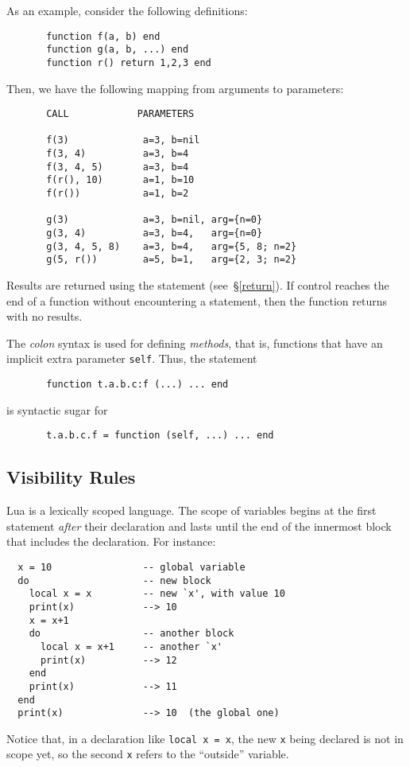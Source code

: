 \documentclass[11pt,twoside]{article}
\makeatletter
\newcommand{\See}[1]{\S\ref{#1}}
\newcommand{\see}[1]{(see~\See{#1})}
\newcommand{\T}[1]{{\tt #1}}
\newcommand{\IndexVerb}[1]{\T{#1}\index{#1@{\tt #1}}}
\newcommand{\IndexEmph}[1]{\emph{#1}\index{#1@{\lowercase{#1}}}}
\makeatother
\begin{document}
As an example, consider the following definitions:
\begin{verbatim}
       function f(a, b) end
       function g(a, b, ...) end
       function r() return 1,2,3 end
\end{verbatim}
Then, we have the following mapping from arguments to parameters:
\begin{verbatim}
       CALL            PARAMETERS

       f(3)             a=3, b=nil
       f(3, 4)          a=3, b=4
       f(3, 4, 5)       a=3, b=4
       f(r(), 10)       a=1, b=10
       f(r())           a=1, b=2

       g(3)             a=3, b=nil, arg={n=0}
       g(3, 4)          a=3, b=4,   arg={n=0}
       g(3, 4, 5, 8)    a=3, b=4,   arg={5, 8; n=2}
       g(5, r())        a=5, b=1,   arg={2, 3; n=2}
\end{verbatim}

Results are returned using the  statement \see{return}.
If control reaches the end of a function
without encountering a  statement,
then the function returns with no results.

The \emph{colon} syntax
is used for defining \IndexEmph{methods},
that is, functions that have an implicit extra parameter \IndexVerb{self}.
Thus, the statement
\begin{verbatim}
       function t.a.b.c:f (...) ... end
\end{verbatim}
is syntactic sugar for
\begin{verbatim}
       t.a.b.c.f = function (self, ...) ... end
\end{verbatim}


\subsection{Visibility Rules} \label{visibility}

Lua is a lexically scoped language.
The scope of variables begins at the first statement \emph{after}
their declaration and lasts until the end of the innermost block that
includes the declaration.
For instance:
\begin{verbatim}
  x = 10                -- global variable
  do                    -- new block
    local x = x         -- new `x', with value 10
    print(x)            --> 10
    x = x+1
    do                  -- another block
      local x = x+1     -- another `x'
      print(x)          --> 12
    end
    print(x)            --> 11
  end
  print(x)              --> 10  (the global one)
\end{verbatim}
Notice that, in a declaration like \verb|local x = x|,
the new \verb|x| being declared is not in scope yet,
so the second \verb|x| refers to the ``outside'' variable.
\end{document}
